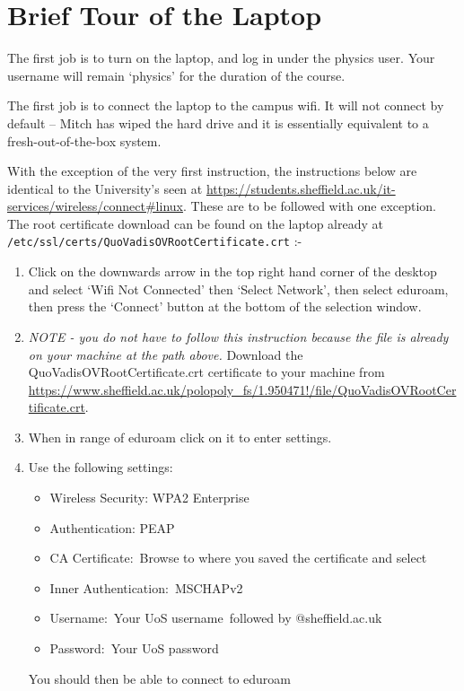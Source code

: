 \documentclass[../physical_computing.tex]{subfiles}
\begin{document}
\section{Brief Tour of the Laptop}
\label{sec:brieftour}

The first job is to turn on the laptop, and log in under the physics user. Your username will remain ‘physics’ for the duration of the course.

The first job is to connect the laptop to the campus wifi. It will not connect by default – Mitch has wiped the hard drive and it is essentially equivalent to a fresh-out-of-the-box system. 

With the exception of the very first instruction, the instructions below are identical to the University’s seen at \url{https://students.sheffield.ac.uk/it-services/wireless/connect#linux}. These are to be followed with one exception. The root certificate download can be found on the laptop already at \\ \texttt{/etc/ssl/certs/QuoVadisOVRootCertificate.crt} :-

\begin{enumerate}
\item{Click on the downwards arrow in the top right hand corner of the desktop and select `Wifi Not Connected' then `Select Network', then select eduroam, then press the `Connect' button at the bottom of the selection window.}
\item{{\it NOTE - you do not have to follow this instruction because the file is already on your machine at the path above.} Download the QuoVadisOVRootCertificate.crt certificate to your machine from \\
\url{https://www.sheffield.ac.uk/polopoly_fs/1.950471!/file/QuoVadisOVRootCertificate.crt}.\\
}
\item{When in range of eduroam click on it to enter settings.}
\item{Use the following settings:
\begin{itemize}
\item{Wireless Security: WPA2 Enterprise}
\item{Authentication: PEAP}
\item{CA Certificate: Browse to where you saved the certificate and select}
\item{Inner Authentication: MSCHAPv2}
\item{Username: Your UoS username followed by @sheffield.ac.uk}
\item{Password: Your UoS password}
\end{itemize}
You should then be able to connect to eduroam}
\end{enumerate}
\end{document}
